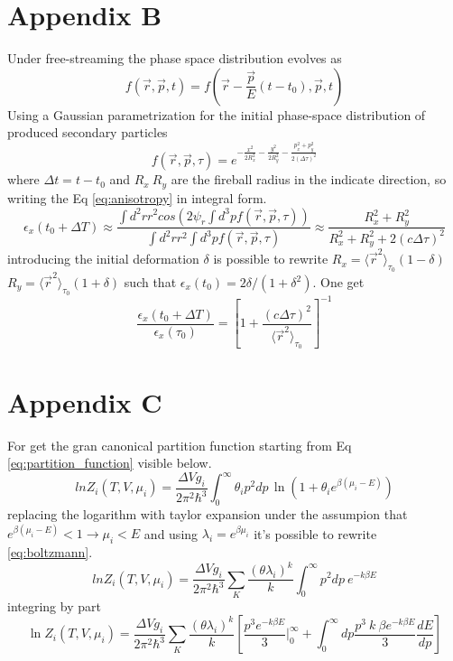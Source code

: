 \documentclass[12pt,a4paper]{book}
\begin{document}
	\section{Appendix B} \label{app:B}
	Under free-streaming the phase space distribution evolves as
	\begin{equation}
		f(\vec{r},\vec{p}, t) = f(\vec{r} - \frac{\vec{p}}{E}(t-t_0), \vec{p}, t) 
	\end{equation}
	Using a Gaussian parametrization for the initial phase-space distribution of produced secondary particles
	\begin{equation}
		f(\vec{r},\vec{p}, \tau) =e^{- \frac{x^2}{2 R_x^2} - \frac{y^2}{2 R_y^2}- \frac{p_x^2+ p_y^2}{2 (\Delta \tau)^2}}
	\end{equation}
	where $\Delta t=t-t_0$ and $R_x \ R_y$ are the fireball radius in the indicate direction, so writing the Eq \ref{eq:anisotropy} in integral form.
	\begin{equation}
		\epsilon_x (t_0 + \Delta T) \approx \frac{\int d^2 r r^2 cos(2 \psi_r \int d^3 p f(\vec{r},\vec{p}, \tau))}{\int d^2 r r^2  \int d^3 p f(\vec{r},\vec{p}, \tau)} \approx \frac{R_x^2 +R_y^2}{R_x^2 +R_y^2 + 2(c \Delta \tau)^2}
	\end{equation}
	introducing the initial deformation $\delta$ is possible to rewrite $R_x=\langle \vec{r}^2 \rangle_{\tau_0}(1-\delta)$ $R_y=\langle \vec{r}^2 \rangle_{\tau_0}(1+\delta)$ such that $\epsilon_x(t_0)=2\delta/(1+\delta^2)$. One get
	\begin{equation}
		\frac{\epsilon_x(t_0 + \Delta T)}{\epsilon_x(\tau_0)} = \left[ 1 + \frac{(c \Delta \tau)^2}{\langle \vec{r}^2 \rangle_{\tau_0}} \right]^{-1}
	\end{equation}
	
	
	\section{Appendix C} \label{app:C}
	For get the gran canonical partition function starting from Eq \ref{eq:partition_function} visible below.
	\begin{equation}
		ln Z_i(T,V,\mu_i)= \frac{\Delta V g_i}{2\pi^2\hbar^3} \int_{0}^{\infty} \theta_i p^2 dp \,  \ln(1+\theta_i e^{\beta(\mu_i-E)})
	\end{equation}
	replacing the logarithm with taylor expansion under the assumpion that $e^{\beta(\mu_i-E)} < 1 \rightarrow \mu_i < E$ and using $\lambda_i= e^{\beta \mu_i}$ it's possible to rewrite \ref{eq:boltzmann}.
	\begin{equation}
		ln Z_i(T,V,\mu_i)= \frac{\Delta V g_i}{2\pi^2\hbar^3} \sum_{K} \frac{(\theta \lambda_i)^k}{k} \int_{0}^{\infty} p^2 dp \  e^{-k \beta E}
	\end{equation}
	integring by part
	\begin{equation}
		\ln Z_i(T,V,\mu_i) = \frac{\Delta V g_i}{2\pi^2\hbar^3} \sum_{K} \frac{(\theta \lambda_i)^k}{k} \left[\frac{p^3 e^{-k \beta E}}{3} \Big|_0^\infty + \int_{0}^{\infty} dp \frac{p^3 \  k \  \beta e^{-k \beta E}}{3} \frac{dE}{dp} \right]
	\end{equation}
	
\end{document}
